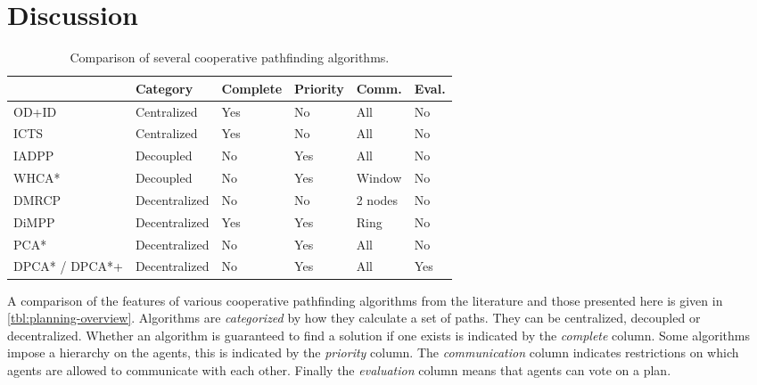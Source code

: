 \section{Discussion}\label{sec:discussion}
\begin{table*}[h]
    \centering
    \caption{Comparison of several cooperative pathfinding algorithms.}
    \label{tbl:planning-overview}
    \begin{tabular}{ll|l|l|l|l|l}
        & & Category & Complete & Priority & Comm. & Eval. \\
        \hline
        OD+ID & \cite{standley2010,standley2011} & Centralized & Yes & No &
        All & No \\
        ICTS & \cite{sharon2013} & Centralized & Yes & No & All & No\\
        IADPP & \cite{cap2012} & Decoupled & No & Yes & All & No \\
        WHCA* & \cite{silver2005} & Decoupled & No & Yes & Window & No \\
        DMRCP & \cite{wei2016} & Decentralized & No & No & 2 nodes & No
        \\
        DiMPP & \cite{chouhan2017} & Decentralized & Yes & Yes & Ring & No
        \\ \hline
        PCA* & & Decentralized & No & Yes & All & No \\
        \multicolumn{2}{l|}{DPCA* / DPCA*+} & Decentralized & No & Yes & All & 
        Yes \\
    \end{tabular}
\end{table*}

A comparison of the features of various cooperative pathfinding algorithms from 
the literature and those presented here is given in 
\autoref{tbl:planning-overview}. Algorithms are \emph{categorized} by how  they 
calculate a set of paths. They can be centralized, decoupled or decentralized. 
Whether an algorithm is guaranteed to find a solution if one exists is 
indicated by the \emph{complete} column. Some algorithms impose a hierarchy on 
the agents, this is indicated by the \emph{priority} column. The 
\emph{communication} column indicates restrictions on which agents are allowed 
to communicate with each other. Finally the \emph{evaluation} column means that 
agents can vote on a plan.



